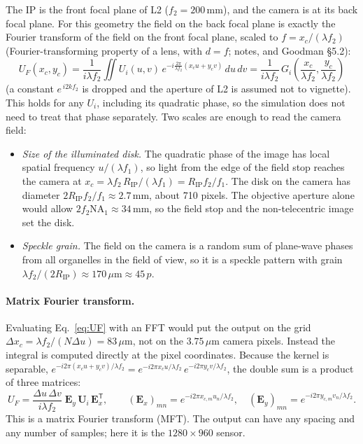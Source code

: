 \documentclass[11pt,a4paper]{article}
\newcommand{\um}{\,\mu\mathrm{m}}
\newcommand{\mm}{\,\mathrm{mm}}
\newcommand{\ee}{e}
\newcommand{\dd}{d}
\begin{document}
The IP is the front focal plane of L2 ($f_2 = 200\mm$), and the camera is at
its back focal plane. For this geometry the field on the back focal plane is
exactly the Fourier transform of the field on the front focal plane, scaled to
$f = x_c/(\lambda f_2)$ (Fourier-transforming property of a lens, with
$d = f$; notes, and Goodman \S5.2):
\begin{equation}
  \boxed{\;U_F(x_c,y_c) = \frac{1}{i\lambda f_2}\iint U_i(u,v)\,
  \ee^{-i\frac{2\pi}{\lambda f_2}(x_cu+y_cv)}\,\dd u\,\dd v
  = \frac{1}{i\lambda f_2}\,G_i\!\left(\frac{x_c}{\lambda f_2},\frac{y_c}{\lambda f_2}\right)\;}
  \label{eq:UF}
\end{equation}
(a constant $\ee^{\,i2kf_2}$ is dropped and the aperture of L2 is assumed not to
vignette). This holds for any $U_i$, including its quadratic phase, so the
simulation does not need to treat that phase separately. Two scales are
enough to read the camera field:
\begin{itemize}[leftmargin=*]
  \item \emph{Size of the illuminated disk.} The quadratic phase of the image
        has local spatial frequency $u/(\lambda f_1)$, so light from the edge
        of the field stop reaches the camera at
        $x_c = \lambda f_2\,R_\mathrm{IP}/(\lambda f_1) = R_\mathrm{IP}f_2/f_1$.
        The disk on the camera has diameter
        $2R_\mathrm{IP}f_2/f_1 \approx 2.7\mm$, about 710 pixels. The
        objective aperture alone would allow $2f_2\mathrm{NA}_1 \approx 34\mm$,
        so the field stop and the non-telecentric image set the disk.
  \item \emph{Speckle grain.} The field on the camera is a random sum of
        plane-wave phases from all organelles in the field of view, so it is a
        speckle pattern with grain $\lambda f_2/(2R_\mathrm{IP}) \approx
        170\um \approx 45\,p$.
\end{itemize}

\paragraph{Matrix Fourier transform.}
Evaluating Eq.~\eqref{eq:UF} with an FFT would put the output on the grid
$\Delta x_c = \lambda f_2/(N\Delta u) = 83\um$, not on the $3.75\um$ camera
pixels. Instead the integral is computed directly at the pixel coordinates.
Because the kernel is separable,
$\ee^{-i2\pi(x_cu+y_cv)/\lambda f_2} = \ee^{-i2\pi x_cu/\lambda f_2}\,\ee^{-i2\pi y_cv/\lambda f_2}$,
the double sum is a product of three matrices:
\begin{equation}
  U_F = \frac{\Delta u\,\Delta v}{i\lambda f_2}\;\mathbf{E}_y\,\mathbf{U}_i\,\mathbf{E}_x^{\mathsf T},
  \qquad
  (\mathbf{E}_x)_{mn} = \ee^{-i2\pi x_{c,m}u_n/\lambda f_2},\quad
  (\mathbf{E}_y)_{mn} = \ee^{-i2\pi y_{c,m}v_n/\lambda f_2}.
  \label{eq:mft}
\end{equation}
This is a matrix Fourier transform (MFT). The output can have any spacing and
any number of samples; here it is the $1280\times960$ sensor.
\end{document}
